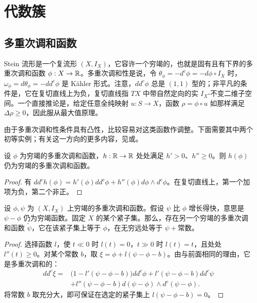 \section{代数簇}\label{sec:19}\label{section:19}
\subsection{多重次调和函数}\label{sec:19a}
Stein 流形是一个复流形 $(X,I_X)$，它容许一个穷竭的，也就是固有且有下界的多重次调和函数 $\phi:X\to\mathbb R$。多重次调和性是说，令 $\theta_\phi=-d^c\phi=-d\phi\circ I_X$ 时，$\omega_\phi=d\theta_\phi=-dd^c\phi$ 是 Kähler 形式。注意，$dd^c\phi$ 总是 $(1,1)$ 型的；非平凡的条件是，它在复切直线上为负，复切直线指 $TX$ 中带自然定向的实 $I_X$-不变二维子空间。一个直接推论是，给定任意全纯映射 $u:S\to X$，函数 $\rho=\phi\circ u$ 如那样满足 $\Delta\rho\ge0$，因此服从最大值原理。

由于多重次调和性条件具有凸性，比较容易对这类函数作调整。下面需要其中两个初等实例；有关这一方向的更多内容，见或。

\begin{lemma}\label{st:19.1}
设 $\phi$ 为穷竭的多重次调和函数，$h:\mathbb R\to\mathbb R$ 处处满足 $h'>0$、$h''\ge0$。则 $h(\phi)$ 仍为穷竭的多重次调和函数。
\end{lemma}
\begin{proof}
有 $dd^ch(\phi)=h'(\phi)dd^c\phi+h''(\phi)d\phi\wedge d^c\phi$。在复切直线上，第一个加项为负，第二个非正。
\end{proof}

\begin{lemma}\label{st:19.2}
设 $\phi,\psi$ 为 $(X,I_X)$ 上穷竭的多重次调和函数。假设 $\psi$ 比 $\phi$ 增长得快，意思是 $\psi-\phi$ 仍为穷竭函数。固定 $X$ 的某个紧子集。那么，存在另一个穷竭的多重次调和函数 $\widetilde\psi$，它在该紧子集上等于 $\phi$，在无穷远处等于 $\psi+\text{常数}$。
\end{lemma}
\begin{proof}
选择函数 $l$，使 $t\ll0$ 时 $l(t)=0$，$t\gg0$ 时 $l(t)=t$，且处处 $l''(t)\ge0$。对某个常数 $b$，取 $\xi=\phi+l(\psi-\phi-b)$。由与前面相同的理由，它是多重次调和的：
\[
\begin{aligned}
dd^c\xi={}&\bigl(1-l'(\psi-\phi-b)\bigr)dd^c\phi
+l'(\psi-\phi-b)dd^c\psi\\
&+l''(\psi-\phi-b)d(\psi-\phi)\wedge d^c(\psi-\phi).
\end{aligned}
\]
将常数 $b$ 取充分大，即可保证在选定的紧子集上 $l(\psi-\phi-b)=0$。
\end{proof}

